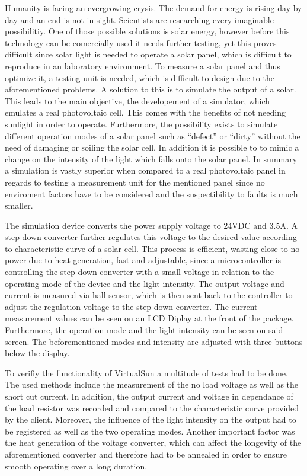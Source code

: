 \documentclass[a4paper]{fhnwreport}
\begin{document}
Humanity is facing an evergrowing crysis. The demand for energy is rising day by day and an end is not in sight. Scientists are researching every  imaginable possibilitiy. One of those possible solutions is solar energy, however before this technology can be comercially used it needs further testing, yet this proves difficult since solar light is needed to operate a solar panel, which is difficult to reproduce in an laboratory environment. To measure a solar panel and thus optimize it, a testing unit is needed, which is difficult to design due to the aforementioned problems. A solution to this is to simulate the output of a solar. This leads to the main objective, the developement of a simulator, which emulates a real photovoltaic cell. This comes with the benefits of not needing sunlight in order to operate. Furthermore, the possibility exists to simulate different operation modes of a solar panel such as ``defect'' or ``dirty'' without the need of damaging or soiling the solar cell. In addition it is possible to to mimic a change on the intensity of the light which falls onto the solar panel. In summary a simulation is vastly superior when compared to a real photovoltaic panel in regards to testing a measurement unit for the mentioned panel
since no enviroment factors have to be considered and the suspectibility to faults is much smaller. 

The simulation device converts the power supply voltage to 24VDC and 3.5A. A step down converter further regulates this voltage to the desired value according to characteristic curve of a solar cell. This process is efficient, wasting close to no power due to heat generation, fast and adjustable, since a microcontroller is controlling the step down converter with a small voltage in relation to the operating mode of the device and the light intensity. The output voltage and current is measured via hall-sensor, which is then sent back to the controller to adjust the regulation voltage to the step down converter. The current measurement values can be seen on an LCD Diplay at the front of the package. Furthermore, the operation mode and the light intensity can be seen on said screen. The beforementioned modes and intensity are adjusted with three buttons below the display. 

To verifiy the functionality of VirtualSun a multitude of tests had to be done. The used methods include the measurement of the no load voltage as well as the short cut current. In addition, the output current and voltage in dependance of the load resistor was recorded and compared to the characteristic curve provided by the client.  Moreover, the influence of the light intensity on the output had to be registered as well as the two operating modes. Another important factor was the heat generation of the voltage converter, which can affect the longevity of the aforementioned converter and therefore had to be annealed in order to ensure smooth operating over a long duration. 

 
\end{document}
